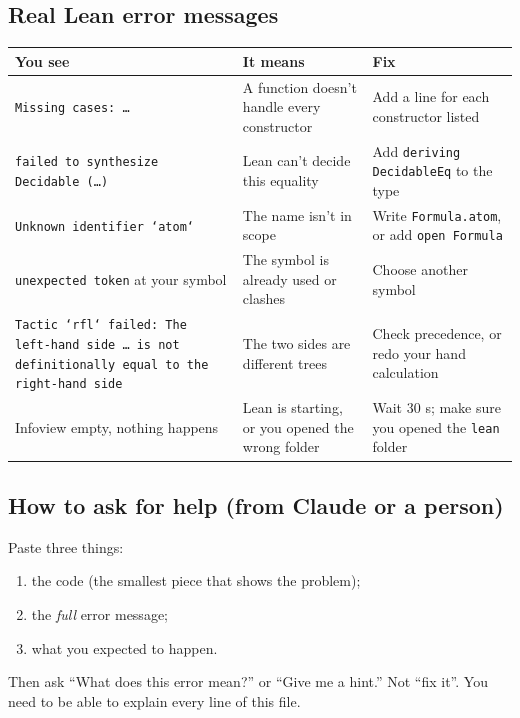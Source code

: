 \documentclass[11pt,a4paper]{article}
\newcommand{\code}[1]{\texttt{#1}}
\begin{document}
\subsection{Real Lean error messages}
\begin{center}
\begin{tabularx}{\linewidth}{@{}>{\raggedright\arraybackslash}p{4.3cm}>{\raggedright\arraybackslash}X>{\raggedright\arraybackslash}X@{}}
\toprule
\textbf{You see} & \textbf{It means} & \textbf{Fix}\\
\midrule
\code{Missing cases: …} & A function doesn't handle every constructor & Add a line for each constructor listed\\
\code{failed to synthesize Decidable (…)} & Lean can't decide this equality & Add \code{deriving DecidableEq} to the type\\
\code{Unknown identifier `atom`} & The name isn't in scope & Write \code{Formula.atom}, or add \code{open Formula}\\
\code{unexpected token} at your symbol & The symbol is already used or clashes & Choose another symbol\\
\code{Tactic `rfl` failed: The left-hand side … is not definitionally equal to the right-hand side} & The two sides are different trees & Check precedence, or redo your hand calculation\\
Infoview empty, nothing happens & Lean is starting, or you opened the wrong folder & Wait 30 s; make sure you opened the \code{lean} folder\\
\bottomrule
\end{tabularx}
\end{center}

\subsection{How to ask for help (from Claude or a person)}
Paste three things:
\begin{enumerate}
\item the code (the smallest piece that shows the problem);
\item the \emph{full} error message;
\item what you expected to happen.
\end{enumerate}
Then ask ``What does this error mean?'' or ``Give me a hint.'' Not ``fix it''. You need to be able to explain every line of this file.
\end{document}
